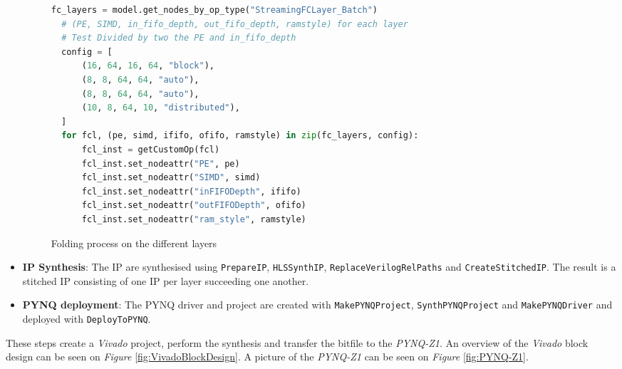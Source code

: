 \begin{itemize}
  \begin{figure}[htbp]
  \centering
  \begin{lstlisting}[language=Python]
  fc_layers = model.get_nodes_by_op_type("StreamingFCLayer_Batch")
  # (PE, SIMD, in_fifo_depth, out_fifo_depth, ramstyle) for each layer
  # Test Divided by two the PE and in_fifo_depth
  config = [
      (16, 64, 16, 64, "block"),
      (8, 8, 64, 64, "auto"),
      (8, 8, 64, 64, "auto"),
      (10, 8, 64, 10, "distributed"),
  ]
  for fcl, (pe, simd, ififo, ofifo, ramstyle) in zip(fc_layers, config):
      fcl_inst = getCustomOp(fcl)
      fcl_inst.set_nodeattr("PE", pe)
      fcl_inst.set_nodeattr("SIMD", simd)
      fcl_inst.set_nodeattr("inFIFODepth", ififo)
      fcl_inst.set_nodeattr("outFIFODepth", ofifo)
      fcl_inst.set_nodeattr("ram_style", ramstyle)
  \end{lstlisting}
  \caption[Folding Process]{Folding process on the different layers}
  	\label{fig:FoldingProcess}
  \end{figure}
  \item \textbf{IP Synthesis}: The IP are synthesised using \texttt{PrepareIP}, \texttt{HLSSynthIP}, \texttt{ReplaceVerilogRelPaths} and \texttt{CreateStitchedIP}. The result is a stitched IP consisting of one IP per layer succeeding one another.
  \item \textbf{PYNQ deployment}: The PYNQ driver and project are created with \texttt{MakePYNQProject}, \texttt{SynthPYNQProject} and \texttt{MakePYNQDriver} and deployed with \texttt{DeployToPYNQ}.
\end{itemize}


These steps create a \emph{Vivado} project, perform the synthesis and transfer the bitfile to the \emph{PYNQ-Z1}. An overview of the \emph{Vivado} block design can be seen on \emph{Figure} \ref{fig:VivadoBlockDesign}. A picture of the \emph{PYNQ-Z1} can be seen on \emph{Figure} \ref{fig:PYNQ-Z1}.




